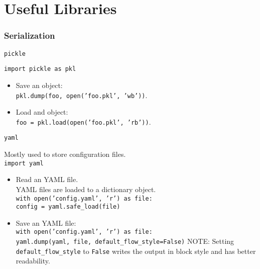 \section{Useful Libraries}

\subsubsection{Serialization}

\begin{center}
    \large{\texttt{pickle}}\\
\end{center}
 
\texttt{import pickle as pkl}
\begin{itemize}
\item Save an object:\\
        \texttt{pkl.dump(foo, open('foo.pkl', 'wb'))}.
\item Load and object:\\
        \texttt{foo = pkl.load(open('foo.pkl', 'rb'))}.
\end{itemize}


\begin{center}
    \large{\texttt{yaml}}\\
\end{center}

Mostly used to store configuration files.\\

\texttt{import yaml}

\begin{itemize}
\item Read an YAML file.\\ 
        YAML files are loaded to a dictionary object.\\
        \texttt{with open('config.yaml', 'r') as file:}\\
        \hspace{8pt}\texttt{config = yaml.safe\_load(file)}\\
\item Save an YAML file:\\
        \texttt{with open('config.yaml', 'r') as file:}\\
        \hspace{8pt}\texttt{yaml.dump(yaml, file, default\_flow\_style=False)}
        NOTE: Setting \texttt{default\_flow\_style} to \texttt{False} writes the output in block style and has better readability.\\
\end{itemize}

